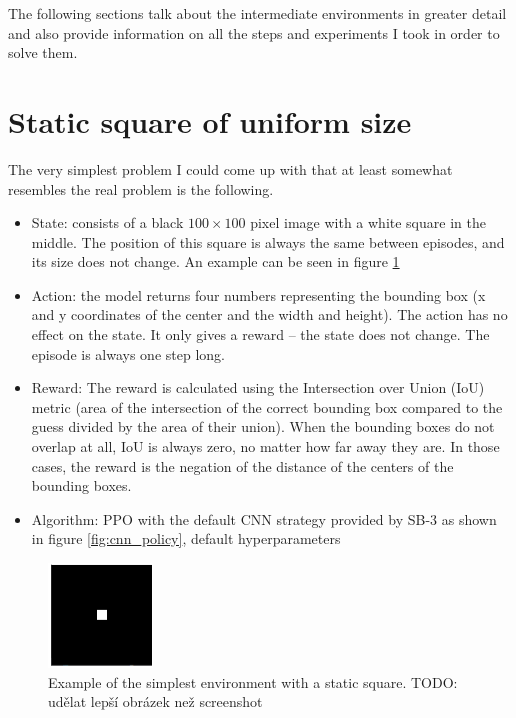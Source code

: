 \documentclass[
  digital,     %
  oneside,     %
  nosansbold,  %
  nocolorbold, %
  lof,         %
  lot,         %
]{fithesis4}
\begin{document}
The following sections talk about the intermediate environments in greater detail and also provide information on all the steps and experiments I took in order to solve them.

\section{Static square of uniform size}
The very simplest problem I could come up with that at least somewhat resembles the real problem is the following.
\begin{itemize}
    \item State: consists of a black $100\times100$ pixel image with a white square in the middle. The position of this square is always the same between episodes, and its size does not change. An example can be seen in figure \ref{fig:env0}
    \item Action: the model returns four numbers representing the bounding box (x and y coordinates of the center and the width and height). The action has no effect on the state. It only gives a reward -- the state does not change. The episode is always one step long.
    \item Reward: The reward is calculated using the Intersection over Union (IoU) metric (area of the intersection of the correct bounding box compared to the guess divided by the area of their union). When the bounding boxes do not overlap at all, IoU is always zero, no matter how far away they are. In those cases, the reward is the negation of the distance of the centers of the bounding boxes.
    \item Algorithm: PPO with the default CNN strategy provided by SB-3 as shown in figure \ref{fig:cnn_policy}, default hyperparameters
\end{itemize}

\begin{figure}
    \includegraphics[width=0.5\linewidth]{env_examples/env0.png}
    \caption{Example of the simplest environment with a static square. TODO: udělat lepší obrázek než screenshot}
    \label{fig:env0}
\end{figure}
\end{document}
